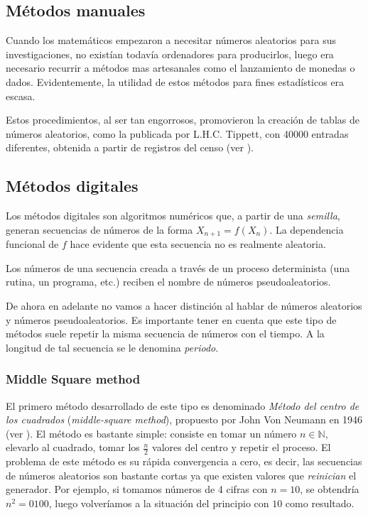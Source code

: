 \subsection{Métodos manuales}

Cuando los matemáticos empezaron a necesitar números aleatorios para sus investigaciones, no existían todavía ordenadores para producirlos, luego era necesario recurrir a métodos mas artesanales como el lanzamiento de monedas o dados. Evidentemente, la utilidad de estos métodos para fines estadísticos era escasa.

Estos procedimientos, al ser tan engorrosos, promovieron la creación de tablas de números aleatorios, como la publicada por L.H.C. Tippett, con 40000 entradas diferentes, obtenida a partir de registros del censo (ver \cite{Tippett}).

\subsection{Métodos digitales}

Los métodos digitales son algoritmos numéricos que, a partir de una \textit{semilla}, generan secuencias de números de la forma $X_{n+1}=f(X_n)$. La dependencia funcional de $f$ hace evidente que esta secuencia no es realmente aleatoria.

\begin{definition}
Los números de una secuencia creada a través de un proceso determinista (una rutina, un programa, etc.) reciben el nombre de números pseudoaleatorios.
\end{definition}

De ahora en adelante no vamos a hacer distinción al hablar de números aleatorios y números pseudoaleatorios. Es importante tener en cuenta que este tipo de métodos suele repetir la misma secuencia de números con el tiempo. A la longitud de tal secuencia se le denomina \textit{periodo}.

\subsubsection{Middle Square method}

El primero método desarrollado de este tipo es denominado \textit{Método del centro de los cuadrados} (\textit{middle-square method}), propuesto por John Von Neumann en 1946 (ver \cite{von195113}). El método es bastante simple: consiste en tomar un número $n\in\mathbb{N}$, elevarlo al cuadrado, tomar los $\frac{n}{2}$ valores del centro y repetir el proceso.  El problema de este método es su rápida convergencia a cero, es decir, las secuencias de números aleatorios son bastante cortas ya que existen valores que \textit{reinician} el generador. Por ejemplo, si tomamos números de 4 cifras con $n=10$, se obtendría $n^2=0100$, luego volveríamos a la situación del principio con $10$ como resultado.

